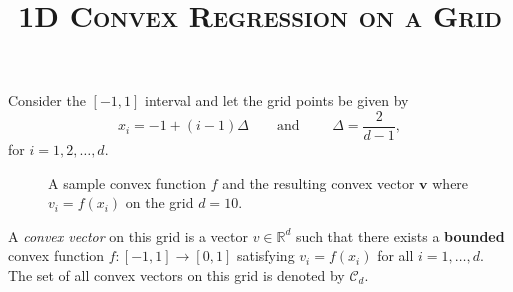 \documentclass{article}
\title{\textsc{1D Convex Regression on a Grid}}
\theoremstyle{plain}
\theoremstyle{definition}
\theoremstyle{plain}
\newcommand{\R}{\mathbb R}
\newcommand{\cC}{\mathcal C}
\begin{document}
\maketitle

Consider the $[-1, 1]$ interval and let the grid points be given by
\[
    x_i = -1 + (i-1)\Delta \qquad \text{and }\qquad \Delta = \frac{2}{d-1},
\]
for $i = 1, 2, \ldots, d$.
\begin{figure}[h]
    \centering
    \caption{A sample convex function $f$ and the resulting convex vector $\bm{v}$ where $v_i = f(x_i)$ on the grid $d=10$.}
    \label{fig:grid_points}
\end{figure}

A \emph{convex vector} on this grid is a vector $v \in \R^{d}$ such that there exists a \textbf{bounded} convex function $f: [-1, 1] \to [0, 1]$ satisfying $v_i = f(x_i)$ for all $i = 1, \ldots, d$. The set of all convex vectors on this grid is denoted by $\cC_d$.
\end{document}
